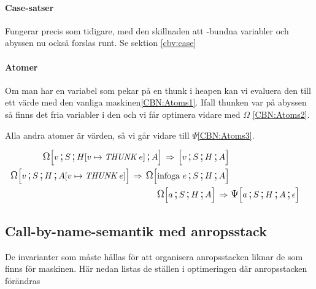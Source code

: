 \documentclass[../Optimise]{subfiles}
\begin{document}
\paragraph{Case-satser}
Fungerar precis som tidigare, med den skillnaden att -bundna variabler 
och abyssen nu också forslas runt. Se sektion \ref{cbv:case}

\paragraph{Atomer}
Om man har en variabel som pekar på en thunk i heapen kan vi evaluera den till ett
värde med den vanliga maskinen\eqref{CBN:Atoms1}. Ifall thunken var på abyssen så
finns det fria variabler i den och vi får optimera vidare med $\Omega$ \eqref{CBN:Atoms2}.

Alla andra atomer är värden, så vi går vidare till $\Psi$\eqref{CBN:Atoms3}.

\begin{align}
\label{CBN:Atoms1}\CBNOMEGA S{\heap v{\THUNK e}}Av \rulesep \CBNMC vSHA\\
\label{CBN:Atoms2}\CBNOMEGA SH{\abyss v{\THUNK e}}v  \rulesep \CBNOMEGA SHA{\text{infoga }e}\\
\label{CBN:Atoms3}\CBNOMEGA SHAa \rulesep &\, \CBNPSI SHA{\epsilon}a
\end{align}


\subsection{Call-by-name-semantik med anropsstack}


De invarianter som måste hållas för att organisera anropsstacken liknar de som finns
för maskinen. Här nedan listas de ställen i optimeringen där anropsstacken förändras
\end{document}
